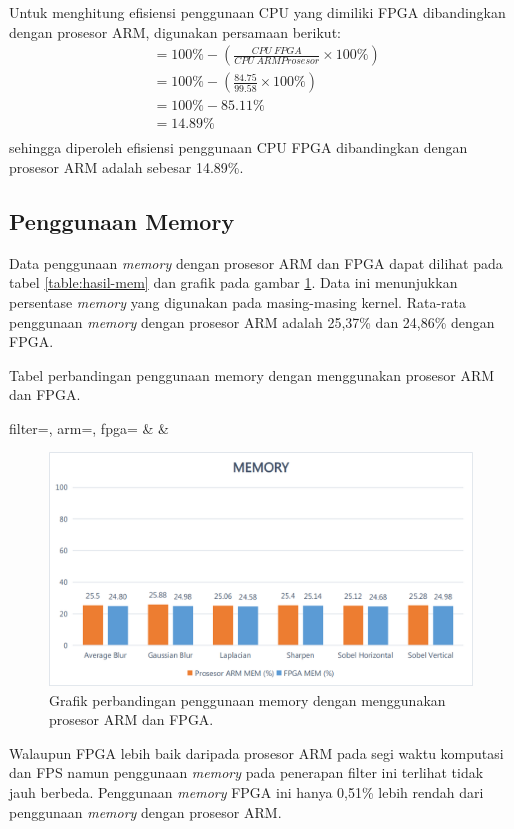 Untuk menghitung efisiensi penggunaan CPU yang dimiliki FPGA dibandingkan dengan prosesor ARM, digunakan persamaan berikut:
\begin{equation*}
    \begin{split}
& = 100\% - \left( \frac{CPU\ FPGA}{CPU\ ARM Prosesor} \times 100\% \right) \\
& = 100\% - \left( \frac{84.75}{99.58} \times 100\% \right) \\
& = 100\% - 85.11\% \\
& = 14.89\% \\
    \end{split}
\end{equation*}
sehingga diperoleh efisiensi penggunaan CPU FPGA dibandingkan dengan prosesor ARM adalah sebesar 14.89\%.

\subsection{Penggunaan Memory}
Data penggunaan \textit{memory} dengan prosesor ARM dan FPGA dapat dilihat pada tabel \ref{table:hasil-mem} dan grafik pada gambar \ref{fig:chart-mem}. Data ini menunjukkan persentase \textit{memory} yang digunakan pada masing-masing kernel. Rata-rata penggunaan \textit{memory} dengan prosesor ARM adalah 25,37\% dan 24,86\% dengan FPGA. 
\begin{atable}
    \caption{Tabel perbandingan penggunaan memory dengan menggunakan prosesor ARM dan FPGA.}
    \label{table:hasil-mem}
        {
            filter=\filter, 
            arm=\arm, 
            fpga=\fpga}
        {
            \filter & 
            \arm & 
            \fpga }
\end{atable}
\begin{figure}[H]
    \includegraphics[width=0.81\linewidth, center]{images/chart/chart-mem.png}
    \caption{Grafik perbandingan penggunaan memory dengan menggunakan prosesor ARM dan FPGA.}
    \label{fig:chart-mem}
\end{figure}
Walaupun FPGA lebih baik daripada prosesor ARM pada segi waktu komputasi dan FPS namun penggunaan \textit{memory} pada penerapan filter ini terlihat tidak jauh berbeda. Penggunaan \textit{memory} FPGA ini hanya 0,51\% lebih rendah dari penggunaan \textit{memory} dengan prosesor ARM.

